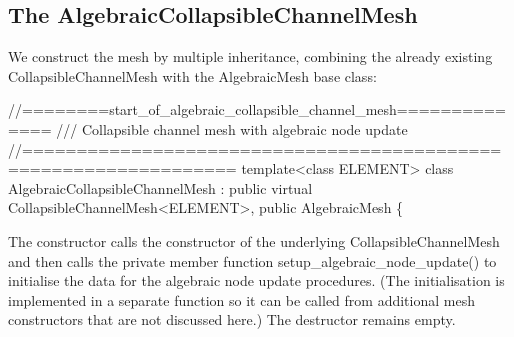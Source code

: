 \hypertarget{index_mesh}{}\subsection{The Algebraic\+Collapsible\+Channel\+Mesh}\label{index_mesh}
We construct the mesh by multiple inheritance, combining the already existing {\ttfamily Collapsible\+Channel\+Mesh} with the {\ttfamily Algebraic\+Mesh} base class\+:

 
\begin{DoxyCodeInclude}
\textcolor{comment}{//========start\_of\_algebraic\_collapsible\_channel\_mesh==============}
\textcolor{comment}{/// Collapsible channel mesh with algebraic node update}
\textcolor{comment}{}\textcolor{comment}{//=================================================================}
\textcolor{keyword}{template}<\textcolor{keyword}{class} ELEMENT>
\textcolor{keyword}{class }AlgebraicCollapsibleChannelMesh : 
  \textcolor{keyword}{public} \textcolor{keyword}{virtual} CollapsibleChannelMesh<ELEMENT>,
  \textcolor{keyword}{public} AlgebraicMesh
\{ 

\end{DoxyCodeInclude}


The constructor calls the constructor of the underlying {\ttfamily Collapsible\+Channel\+Mesh} and then calls the private member function {\ttfamily setup\+\_\+algebraic\+\_\+node\+\_\+update()} to initialise the data for the algebraic node update procedures. (The initialisation is implemented in a separate function so it can be called from additional mesh constructors that are not discussed here.) The destructor remains empty.


